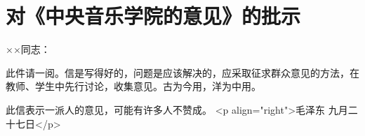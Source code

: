 \section[对《中央音乐学院的意见》的批示（一九六四年九月二十七日）]{对《中央音乐学院的意见》的批示}


××同志：

此件请一阅。信是写得好的，问题是应该解决的，应采取征求群众意见的方法，在教师、学生中先行讨论，收集意见。古为今用，洋为中用。

此信表示一派人的意见，可能有许多人不赞成。
<p align="right">毛泽东
九月二十七日</p>


